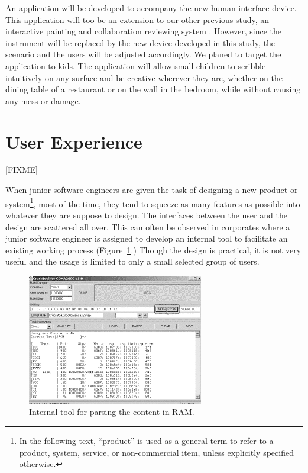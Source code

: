 \documentclass{acm_proc_article-sp}
\begin{document}
An application will be developed to accompany the new human interface
device. This application will too be an extension to our other
previous study, an interactive painting and collaboration reviewing
system \citep{baba:abeyrathne}. However, since the instrument will be
replaced by the new device developed in this study, the scenario and
the users will be adjusted accordingly. We planed to target the
application to kids. The application will allow small children to
scribble intuitively on any surface and be creative wherever they are,
whether on the dining table of a restaurant or on the wall in the
bedroom, while without causing any mess or damage.



\section{User Experience}
\label{sec:ux}
[FIXME]

When junior software engineers are given the task of designing a new
product or system\footnote{In the following text, ``product'' is used
  as a general term to refer to a product, system, service, or
  non-commercial item, unless explicitly specified otherwise.}, most
of the time, they tend to squeeze as many features as possible into
whatever they are suppose to design. The interfaces between the user
and the design are scattered all over. This can often be observed in
corporates where a junior software engineer is assigned to develop an
internal tool to facilitate an existing working process
(Figure~\ref{fig:featureful}.)  Though the design is practical, it is
not very useful and the usage is limited to only a small selected
group of users.

\begin{figure}[!t]
\centering
\includegraphics[width=.7\columnwidth]{featureful}
\caption{Internal tool for parsing the content in RAM.}
\label{fig:featureful}
\end{figure}
\end{document}
